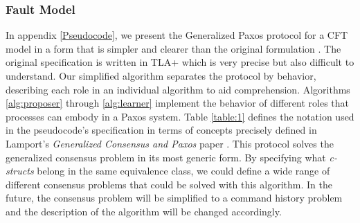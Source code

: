 \documentclass[runningheads,a4paper]{llncs}
\begin{document}
\subsubsection{Fault Model} \label{Fault Model}
In appendix \ref{Pseudocode}, we present the Generalized Paxos protocol for a CFT model in a form that is simpler and clearer than the original formulation \cite{Lamport2005}. The original specification is written in TLA+ which is very precise but also difficult to understand. Our simplified algorithm separates the protocol by behavior, describing each role in an individual algorithm to aid comprehension. Algorithms \ref{alg:proposer} through \ref{alg:learner} implement the behavior of different roles that processes can embody in a Paxos system. Table \ref{table:1} defines the notation used in the pseudocode's specification in terms of concepts precisely defined in Lamport's \textit{Generalized Consensus and Paxos} paper \cite{Lamport2005}. This protocol solves the generalized consensus problem in its most generic form. By specifying what \textit{c-structs} belong in the same equivalence class, we could define a wide range of different consensus problems that could be solved with this algorithm. In the future, the consensus problem will be simplified to a command history problem and the description of the algorithm will be changed accordingly. \par 
\end{document}
